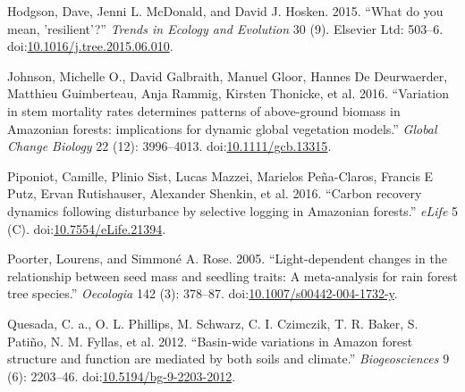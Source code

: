 \documentclass[]{elsarticle} %
\begin{document}
\hypertarget{ref-Hodgson2015}{}
Hodgson, Dave, Jenni L. McDonald, and David J. Hosken. 2015. ``What do
you mean, 'resilient'?'' \emph{Trends in Ecology and Evolution} 30 (9).
Elsevier Ltd: 503--6.
doi:\href{https://doi.org/10.1016/j.tree.2015.06.010}{10.1016/j.tree.2015.06.010}.

\hypertarget{ref-Johnson2016}{}
Johnson, Michelle O., David Galbraith, Manuel Gloor, Hannes De
Deurwaerder, Matthieu Guimberteau, Anja Rammig, Kirsten Thonicke, et al.
2016. ``Variation in stem mortality rates determines patterns of
above-ground biomass in Amazonian forests: implications for dynamic
global vegetation models.'' \emph{Global Change Biology} 22 (12):
3996--4013.
doi:\href{https://doi.org/10.1111/gcb.13315}{10.1111/gcb.13315}.

\hypertarget{ref-Piponiot2016a}{}
Piponiot, Camille, Plinio Sist, Lucas Mazzei, Marielos Peña-Claros,
Francis E Putz, Ervan Rutishauser, Alexander Shenkin, et al. 2016.
``Carbon recovery dynamics following disturbance by selective logging in
Amazonian forests.'' \emph{eLife} 5 (C).
doi:\href{https://doi.org/10.7554/eLife.21394}{10.7554/eLife.21394}.

\hypertarget{ref-Poorter2005a}{}
Poorter, Lourens, and Simmoné A. Rose. 2005. ``Light-dependent changes
in the relationship between seed mass and seedling traits: A
meta-analysis for rain forest tree species.'' \emph{Oecologia} 142 (3):
378--87.
doi:\href{https://doi.org/10.1007/s00442-004-1732-y}{10.1007/s00442-004-1732-y}.

\hypertarget{ref-Quesada2012}{}
Quesada, C. a., O. L. Phillips, M. Schwarz, C. I. Czimczik, T. R. Baker,
S. Patiño, N. M. Fyllas, et al. 2012. ``Basin-wide variations in Amazon
forest structure and function are mediated by both soils and climate.''
\emph{Biogeosciences} 9 (6): 2203--46.
doi:\href{https://doi.org/10.5194/bg-9-2203-2012}{10.5194/bg-9-2203-2012}.
\end{document}
